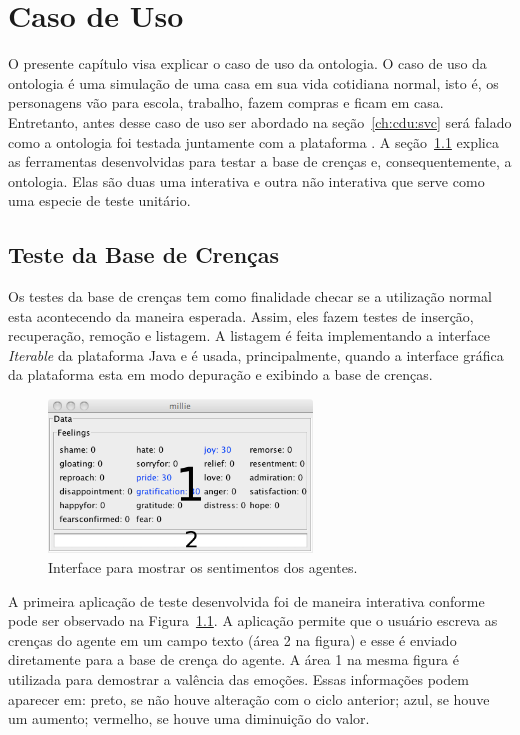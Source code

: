 \chapter{Caso de Uso} \label{ch:cdu}

O presente capítulo visa explicar o caso de uso da ontologia. O caso de uso da
ontologia é uma simulação de uma casa em sua vida cotidiana normal, isto é, os
personagens vão para escola, trabalho, fazem compras e ficam em casa.
Entretanto, antes desse caso de uso ser abordado na seção~\ref{ch:cdu:svc}
será falado como a ontologia foi testada juntamente com a plataforma \jason.
A seção~\ref{ch:cdu:tbc} explica as ferramentas desenvolvidas para testar a base
de crenças e, consequentemente, a ontologia. Elas são duas uma interativa e
outra não interativa que serve como uma especie de teste unitário.

\section{Teste da Base de Crenças} \label{ch:cdu:tbc}

Os testes da base de crenças tem como finalidade checar se a utilização normal
esta acontecendo da maneira esperada. Assim, eles fazem testes de inserção,
recuperação, remoção e listagem. A listagem é feita implementando a interface
\emph{Iterable} da plataforma Java e é usada, principalmente, quando a
interface gráfica da plataforma \jason esta em modo depuração e
exibindo a base de crenças.

\begin{figure}
	\begin{center}
		\includegraphics[width=70mm]{figuras/introductionDF.png}
	\end{center}
	\caption{Interface para mostrar os sentimentos dos agentes.}
	\label{fig:introducaoDF}
\end{figure}

A primeira aplicação de teste desenvolvida foi de maneira interativa conforme
pode ser observado na Figura~\ref{fig:introducaoDF}. A aplicação permite que o
usuário escreva as crenças do agente em um campo texto (área 2 na figura) e
esse é enviado diretamente para a base de crença do agente. A área 1 na mesma
figura é utilizada para demostrar a valência das emoções.
Essas informações podem aparecer em: preto, se não houve alteração com o ciclo
anterior; azul, se houve um aumento; vermelho, se houve uma diminuição do
valor.

